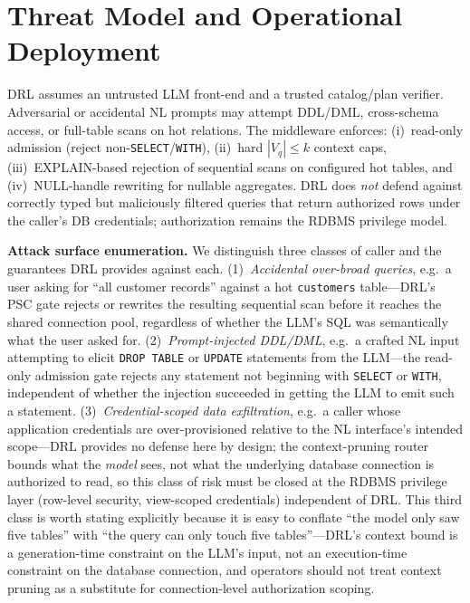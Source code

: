 \documentclass[twocolumn]{svjour3}
\begin{document}
\section{Threat Model and Operational Deployment}
\label{sec:deploy}

DRL assumes an untrusted LLM front-end and a trusted catalog/plan verifier.
Adversarial or accidental NL prompts may attempt DDL/DML, cross-schema access, or full-table scans on hot relations.
The middleware enforces: (i)~read-only admission (reject non-\texttt{SELECT}/\texttt{WITH}), (ii)~hard $|V_q|\le k$ context caps, (iii)~EXPLAIN-based rejection of sequential scans on configured hot tables, and (iv)~NULL-handle rewriting for nullable aggregates.
DRL does \emph{not} defend against correctly typed but maliciously filtered queries that return authorized rows under the caller's DB credentials; authorization remains the RDBMS privilege model.

\textbf{Attack surface enumeration.}
We distinguish three classes of caller and the guarantees DRL provides against each.
(1)~\emph{Accidental over-broad queries}, e.g.\ a user asking for ``all customer records'' against a hot \texttt{customers} table---DRL's PSC gate rejects or rewrites the resulting sequential scan before it reaches the shared connection pool, regardless of whether the LLM's SQL was semantically what the user asked for.
(2)~\emph{Prompt-injected DDL/DML}, e.g.\ a crafted NL input attempting to elicit \texttt{DROP TABLE} or \texttt{UPDATE} statements from the LLM---the read-only admission gate rejects any statement not beginning with \texttt{SELECT} or \texttt{WITH}, independent of whether the injection succeeded in getting the LLM to emit such a statement.
(3)~\emph{Credential-scoped data exfiltration}, e.g.\ a caller whose application credentials are over-provisioned relative to the NL interface's intended scope---DRL provides no defense here by design; the context-pruning router bounds what the \emph{model} sees, not what the underlying database connection is authorized to read, so this class of risk must be closed at the RDBMS privilege layer (row-level security, view-scoped credentials) independent of DRL.
This third class is worth stating explicitly because it is easy to conflate ``the model only saw five tables'' with ``the query can only touch five tables''---DRL's context bound is a generation-time constraint on the LLM's input, not an execution-time constraint on the database connection, and operators should not treat context pruning as a substitute for connection-level authorization scoping.
\end{document}
